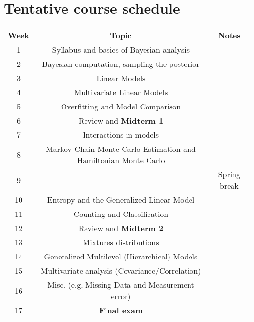\documentclass[11pt,onecolumn]{article}
\begin{document}
\section*{Tentative course schedule}
\begin{center}
  \begin{tabular}{|c|c|c|}
    \hline
    Week & Topic & Notes \\
    \hline
    1 & Syllabus and basics of Bayesian analysis & \\
    \hline
    2 & Bayesian computation, sampling the posterior & \\
    \hline
    3 & Linear Models & \\
    \hline
    4 & Multivariate Linear Models & \\
    \hline
    5 & Overfitting and Model Comparison & \\
    \hline
    6 & Review and \textbf{Midterm 1} & \\
    \hline
    7 & Interactions in models & \\
    \hline
    8 & Markov Chain Monte Carlo Estimation and Hamiltonian Monte Carlo & \\
    \hline
    9 & -- & Spring break\\
    \hline
    10 & Entropy and the Generalized Linear Model & \\
    \hline
    11 & Counting and Classification & \\
    \hline
    12 & Review and \textbf{Midterm 2} & \\
    \hline
    13 & Mixtures distributions & \\
    \hline
    14 & Generalized Multilevel (Hierarchical) Models & \\
    \hline
    15 & Multivariate analysis (Covariance/Correlation) & \\
    \hline
    16 & Misc. (e.g. Missing Data and Measurement error) & \\
    \hline
    17 & \textbf{Final exam} & \\
    \hline
\end{tabular}
\end{center}
\end{document}
